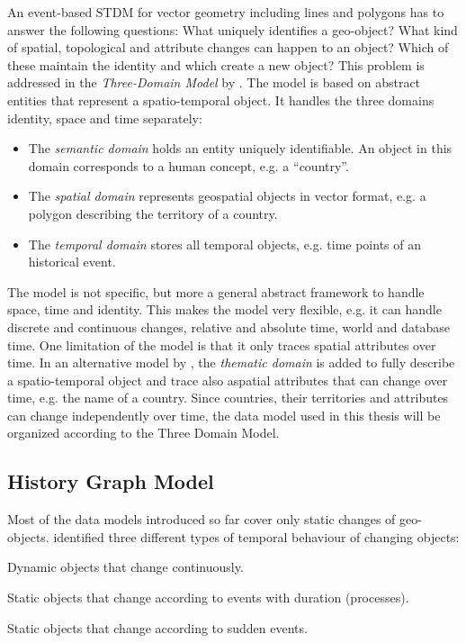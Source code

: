 An event-based STDM for vector geometry including lines and polygons has to answer the following questions: What uniquely identifies a geo-object? What kind of spatial, topological and attribute changes can happen to an object? Which of these maintain the identity and which create a new object? This problem is addressed in the \emph{Three-Domain Model} by \cite{yuan96threedomain, yuan96temporal}. The model is based on abstract entities that represent a spatio-temporal object. It handles the three domains identity, space and time separately:
\begin{itemize}
  \item The \emph{semantic domain} holds an entity uniquely identifiable. An object in this domain corresponds to a human concept, e.g. a ``country''.
  \item The \emph{spatial domain} represents geospatial objects in vector format, e.g. a polygon describing the territory of a country.
  \item The \emph{temporal domain} stores all temporal objects, e.g. time points of an historical event.
\end{itemize}

The model is not specific, but more a general abstract framework to handle space, time and identity. This makes the model very flexible, e.g. it can handle discrete and continuous changes, relative and absolute time, world and database time. One limitation of the model is that it only traces spatial attributes over time. In an alternative model by \cite{claramunt95timeingis}, the \emph{thematic domain} is added to fully describe a spatio-temporal object and trace also aspatial attributes that can change over time, e.g. the name of a country. Since countries, their territories and attributes can change independently over time, the data model used in this thesis will be organized according to the Three Domain Model.


\subsection{History Graph Model} %
\label{sub:history_graph_model}

Most of the data models introduced so far cover only static changes of geo-objects. \cite{renolen96} identified three different types of temporal behaviour of changing objects:
\begin{compactitem}
  \item Dynamic objects that change continuously.
  \item Static objects that change according to events with duration (processes).
  \item Static objects that change according to sudden events.
\end{compactitem}

